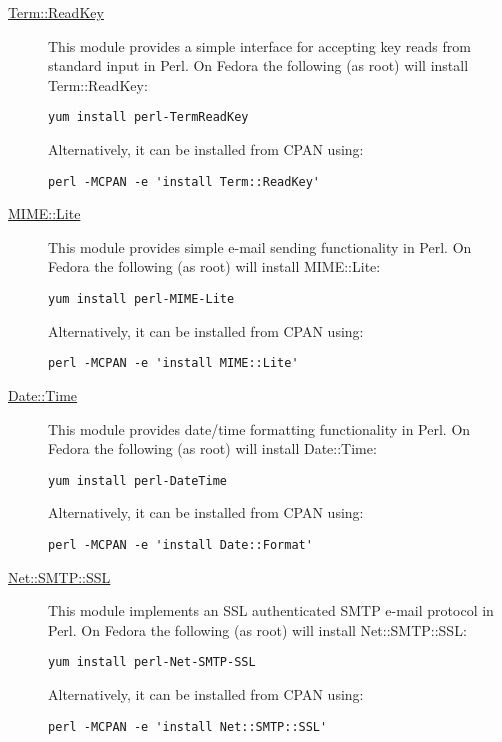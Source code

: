 \begin{description}
  \item [\href{http://search.cpan.org/dist/TermReadKey/ReadKey.pm}{{\normalfont \ttfamily Term::ReadKey}}] This module provides a simple interface for accepting key reads from standard input in Perl. On Fedora the following (as root) will install {\normalfont \ttfamily Term::ReadKey}:
\begin{verbatim}
yum install perl-TermReadKey
\end{verbatim}
Alternatively, it can be installed from CPAN using:
\begin{verbatim}
perl -MCPAN -e 'install Term::ReadKey'
\end{verbatim}
  \item [\href{http://search.cpan.org/~rjbs/MIME-Lite-3.027/lib/MIME/Lite.pm}{{\normalfont \ttfamily MIME::Lite}}] This module provides simple e-mail sending functionality in Perl. On Fedora the following (as root) will install {\normalfont \ttfamily MIME::Lite}:
\begin{verbatim}
yum install perl-MIME-Lite
\end{verbatim}
Alternatively, it can be installed from CPAN using:
\begin{verbatim}
perl -MCPAN -e 'install MIME::Lite'
\end{verbatim}
  \item [\href{http://search.cpan.org/~gbarr/TimeDate-1.20/lib/Date/Format.pm}{{\normalfont \ttfamily Date::Time}}] This module provides date/time formatting functionality in Perl. On Fedora the following (as root) will install {\normalfont \ttfamily Date::Time}:
\begin{verbatim}
yum install perl-DateTime
\end{verbatim}
Alternatively, it can be installed from CPAN using:
\begin{verbatim}
perl -MCPAN -e 'install Date::Format'
\end{verbatim}
  \item [\href{http://search.cpan.org/~cwest/Net-SMTP-SSL-1.01/lib/Net/SMTP/SSL.pm}{{\normalfont \ttfamily Net::SMTP::SSL}}] This module implements an SSL authenticated SMTP e-mail protocol in Perl. On Fedora the following (as root) will install {\normalfont \ttfamily Net::SMTP::SSL}:
\begin{verbatim}
yum install perl-Net-SMTP-SSL
\end{verbatim}
Alternatively, it can be installed from CPAN using:
\begin{verbatim}
perl -MCPAN -e 'install Net::SMTP::SSL'
\end{verbatim}

\end{description}

